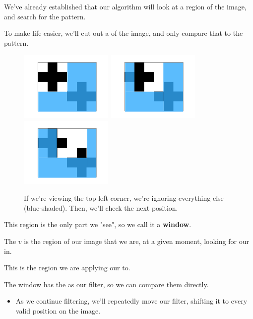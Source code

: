         We've already established that our algorithm will look at a  region of the image, and search for the pattern.

        To make life easier, we'll cut out a  of the image, and only compare that to the pattern. 

        \begin{figure}[H]
            \includegraphics[width=45mm,scale=0.5]{images/convolutional_neural_networks_images/window.png}
            \includegraphics[width=45mm,scale=0.5]{images/convolutional_neural_networks_images/window2.png}
            \includegraphics[width=45mm,scale=0.5]{images/convolutional_neural_networks_images/window3.png}
            
            \caption*{If we're viewing the top-left corner, we're ignoring everything else (blue-shaded). Then, we'll check the next position.}
        \end{figure}
        
        This region is the only part we "see", so we call it a \textbf{window}.\\

        \begin{definition}
            The  $v$ is the region of our image that we are, at a given moment, looking for our  in.

            This is the region we are applying our  to.

            The window has the  as our filter, so we can compare them directly.

            \subsecdiv

            \begin{itemize}
                \item As we continue filtering, we'll repeatedly move our filter, shifting it to every valid position on the image.
            \end{itemize}
        \end{definition}
        


